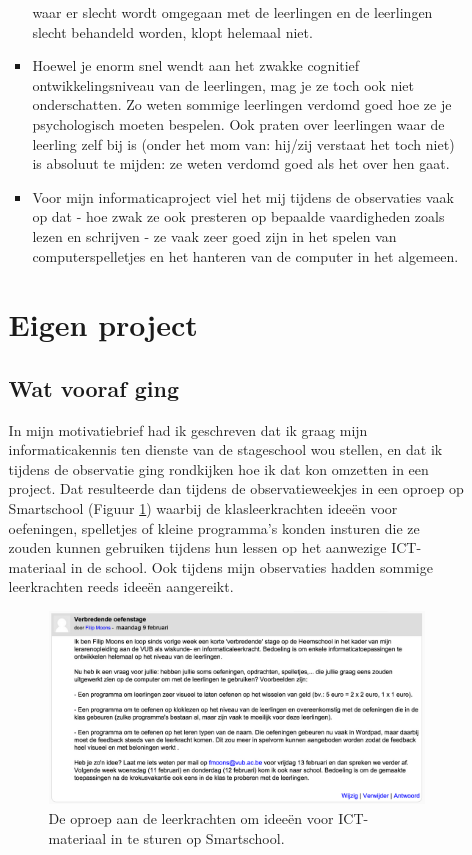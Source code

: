\documentclass[a4paper,11pt]{article}
\theoremstyle{definition}
\begin{document}
\begin{itemize}
\begin{itemize}
\begin{itemize}
  waar er slecht wordt omgegaan met de leerlingen en de leerlingen slecht 
  behandeld worden, klopt helemaal niet.
  \item Hoewel je enorm snel wendt aan het zwakke cognitief ontwikkelingsniveau 
  van de leerlingen, mag je ze toch ook niet onderschatten. Zo weten sommige 
  leerlingen verdomd goed hoe ze je psychologisch moeten bespelen. Ook praten 
  over leerlingen waar de leerling zelf bij is (onder het mom van: hij/zij verstaat het toch niet) 
  is absoluut te mijden: ze weten verdomd goed als het over hen gaat.
  \item Voor mijn informaticaproject viel het mij tijdens de observaties vaak op 
  dat - hoe zwak ze ook presteren op bepaalde vaardigheden zoals lezen en 
  schrijven - ze vaak zeer goed zijn in het spelen van computerspelletjes en het 
  hanteren van de computer in het algemeen. 
  
  
  
\end{itemize}

\newpage
\section{Eigen project}\label{project}
\subsection{Wat vooraf ging}
In mijn motivatiebrief had ik geschreven dat ik graag mijn informaticakennis ten 
dienste van de stageschool wou stellen, en dat ik tijdens de observatie ging rondkijken 
hoe ik dat kon omzetten in een project. Dat resulteerde dan tijdens de observatieweekjes in een oproep op Smartschool (Figuur \ref{oproep}) waarbij de klasleerkrachten ideeën voor oefeningen, spelletjes of kleine programma's konden insturen die 
ze zouden kunnen gebruiken tijdens hun lessen op het aanwezige ICT-materiaal in de school. Ook tijdens mijn observaties hadden sommige leerkrachten reeds ideeën aangereikt. \begin{figure}[h!]
  \centering
  \includegraphics[scale=0.27]{oproep.jpg}\caption{De oproep aan de leerkrachten om ideeën voor ICT-materiaal in te sturen op Smartschool.}\label{oproep}
\end{figure}
\\
 

\end{itemize}
\end{itemize}
\end{document}

